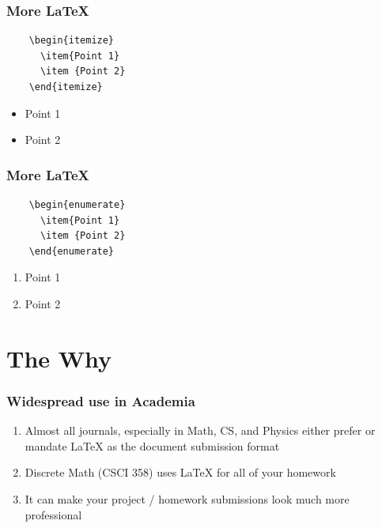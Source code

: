 \documentclass{beamer}
\newcommand{\latex}{\LaTeX\xspace}
\begin{document}
\begin{frame}[fragile]
  \frametitle{More \latex}
  \begin{verbatim}
    \begin{itemize}
      \item{Point 1}
      \item {Point 2}
    \end{itemize}
  \end{verbatim}\par
    \hrulefill\par
  
  
    \begin{itemize}
      \item{Point 1}
      \item {Point 2}
    \end{itemize}
  
  \end{frame}

\begin{frame}[fragile]
  \frametitle{More \latex}
  \begin{verbatim}
    \begin{enumerate}
      \item{Point 1}
      \item {Point 2}
    \end{enumerate}
  \end{verbatim}\par
    \hrulefill\par
  
  
    \begin{enumerate}
      \item{Point 1}
      \item {Point 2}
    \end{enumerate}
  
  \end{frame}

\section{The Why}


\begin{frame}[fragile]
  \frametitle{Widespread use in Academia}

  \begin{enumerate}
    \item {Almost all journals, especially in Math, CS, and Physics
      either prefer or mandate \latex as the document submission
      format}
    \item {Discrete Math (CSCI 358) uses \latex for all of your homework}
    \item {It can make your project / homework submissions look much more professional}
   \end{enumerate}

\vskip 1cm

\end{frame}
\end{document}
